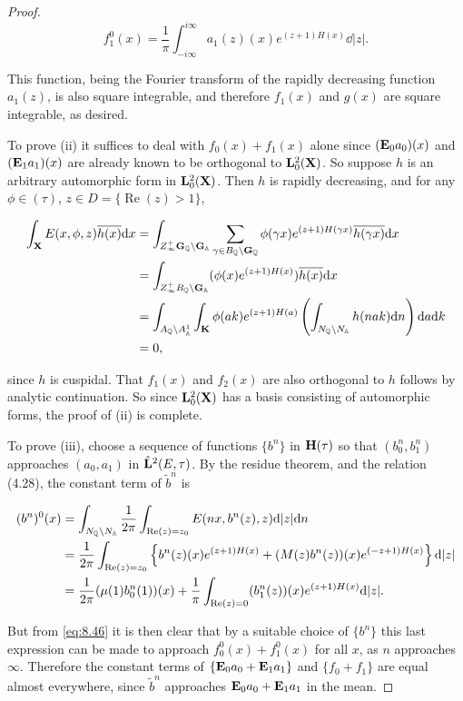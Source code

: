 \begin{proof}
\begin{equation}\label{eq:8.46}
f_{1}^{0}(x) = \frac{1}{\pi}\int_{-i\infty}^{i\infty} a_{1}(z)(x)e^{(z+1)H(x)} \dd|z|.\tag{8.46}
\end{equation}

This function, being the Fourier transform of the rapidly decreasing function $a_{1}(z)$, is also square integrable, and therefore $f_{1}(x)$ and $g(x)$ are square integrable, as desired.

To prove (ii) it suffices to deal with $f_{0}(x) + f_{1}(x)$ alone since $(\mathbf{E}_{0}a_{0})(x)$ and $(\mathbf{E}_{1}a_{1})(x)$ are already known to be orthogonal to $\mathbf{L}_{0}^{2}(\mathbf{X})$. So suppose $h$ is an arbitrary automorphic form in $\mathbf{L}_{0}^{2}(\mathbf{X})$. Then $h$ is rapidly decreasing, and for any $\phi \in (\tau)$, $z \in D = \{\operatorname{Re}(z) > 1\}$,

\[
\begin{aligned}
\int_{\mathbf{X}} E(x,\phi,z)\overline{h(x)} \mathrm{d} x &= \int_{Z_{\infty}^{+}\mathbf{G}_{\mathbb{Q}}\backslash\mathbf{G}_{\mathbb{A}}} \sum_{\gamma \in B_{\mathbb{Q}}\backslash\mathbf{G}_{\mathbb{Q}}} \phi(\gamma x)e^{(z+1)H(\gamma x)}\overline{h(\gamma x)} \mathrm{d} x\\
&= \int_{Z_{\infty}^{+}B_{\mathbb{Q}}\backslash\mathbf{G}_{\mathbb{A}}} (\phi(x)e^{(z+1)H(x)})\overline{h(x)} \mathrm{d} x\\
&= \int_{A_{\mathbb{Q}}\backslash A_{\mathbb{A}}^{1}}\int_{\mathbf{K}} \phi(ak)e^{(z+1)H(a)}\left(\int_{N_{\mathbb{Q}}\backslash N_{\mathbb{A}}} h(nak) \mathrm{d} n\right) \mathrm{d} a \mathrm{d} k\\
&= 0,
\end{aligned}
\]

since $h$ is cuspidal. That $f_{1}(x)$ and $f_{2}(x)$ are also orthogonal to $h$ follows by analytic continuation. So since $\mathbf{L}_{0}^{2}(\mathbf{X})$ has a basis consisting of automorphic forms, the proof of (ii) is complete.

To prove (iii), choose a sequence of functions $\{b^{n}\}$ in $\mathbf{H}(\tau)$ so that $(b_{0}^{n},b_{1}^{n})$ approaches $(a_{0},a_{1})$ in $\hat{\mathbf{L}}^{2}(E,\tau)$. By the residue theorem, and the relation (4.28), the constant term of $\tilde{b}^{n}$ is

\[
\begin{aligned}
(b^{n})^{0}(x) &= \int_{N_{\mathbb{Q}}\backslash N_{\mathbb{A}}} \frac{1}{2\pi}\int_{\operatorname{Re}(z) = z_{0}} E(nx,b^{n}(z),z) \mathrm{d}|z| \mathrm{d} n\\
&= \frac{1}{2\pi}\int_{\operatorname{Re}(z) = z_{0}} \left\{b^{n}(z)(x)e^{(z+1)H(x)} + (M(z)b^{n}(z))(x)e^{(-z+1)H(x)}\right\} \mathrm{d}|z|\\
&= \frac{1}{2\pi}(\mu(1)b_{0}^{n}(1))(x) + \frac{1}{\pi}\int_{\operatorname{Re}(z) = 0} (b_{1}^{n}(z))(x)e^{(z+1)H(x)} \mathrm{d}|z|.
\end{aligned}
\]

But from \eqref{eq:8.46} it is then clear that by a suitable choice of $\{b^{n}\}$ this last expression can be made to approach $f_{0}^{0}(x) + f_{1}^{0}(x)$ for all $x$, as $n$ approaches $\infty$. Therefore the constant terms of $\{\mathbf{E}_{0}a_{0} + \mathbf{E}_{1}a_{1}\}$ and $\{f_{0} + f_{1}\}$ are equal almost everywhere, since $\tilde{b}^{n}$ approaches $\mathbf{E}_{0}a_{0} + \mathbf{E}_{1}a_{1}$ in the mean.

\end{proof}

